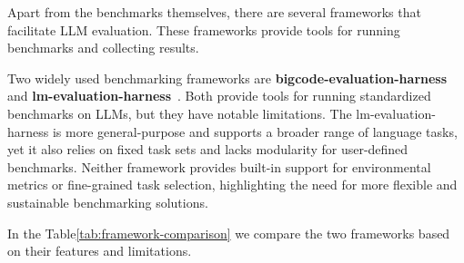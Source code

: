Apart from the benchmarks themselves, there are several frameworks that facilitate LLM evaluation.
These frameworks provide tools for running benchmarks and collecting results.

Two widely used benchmarking frameworks are \textbf{bigcode-evaluation-harness}~\cite{bigcode-evaluation-harness} and \textbf{lm-evaluation-harness}~\cite{githubGitHubEleutherAIlmevaluationharness}.
Both provide tools for running standardized benchmarks on LLMs, but they have notable limitations.
The lm-evaluation-harness is more general-purpose and supports a broader range of language tasks, yet it also relies on fixed task sets and lacks modularity for user-defined benchmarks.
Neither framework provides built-in support for environmental metrics or fine-grained task selection, highlighting the need for more flexible and sustainable benchmarking solutions.

In the Table\ref{tab:framework-comparison} we compare the two frameworks based on their features and limitations.

